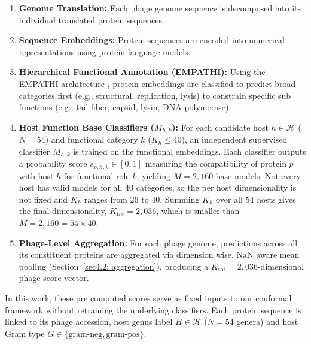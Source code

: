\begin{enumerate}
    \item \textbf{Genome Translation:} Each phage genome sequence is decomposed into its individual translated protein sequences.
    \item \textbf{Sequence Embeddings:} Protein sequences are encoded into numerical representations using protein language models.
    \item \textbf{Hierarchical Functional Annotation (EMPATHI):} Using the EMPATHI architecture \cite{boulay2025empathi}, protein 
          embeddings are classified to predict broad categories first (e.g., structural, replication, lysis) to 
          constrain specific sub functions (e.g., tail fiber, capsid, lysin, DNA polymerase).
    \item \textbf{Host Function Base Classifiers ($M_{h,k}$):} For each candidate host $h \in \mathcal{H}$ ($N = 54$) and functional 
           category $k$ ($K_h \le 40$), an independent supervised classifier $M_{h,k}$ is trained on the functional embeddings. 
           Each classifier outputs a probability score $s_{p,h,k} \in [0, 1]$ measuring the compatibility of protein $p$ with host 
           $h$ for functional role $k$, yielding $M = 2{,}160$ base models. Not every host has valid models for all 40 categories, so 
           the per host dimensionality is not fixed and $K_h$ ranges from 26 to 40. Summing $K_h$ over all 54 hosts gives the final 
           dimensionality, $K_{\text{tot}} = 2{,}036$, which is smaller than $M = 2{,}160 = 54 \times 40$.
    \item \textbf{Phage-Level Aggregation:} For each phage genome, predictions across all its constituent proteins are aggregated via 
           dimension wise, $\mathrm{NaN}$ aware mean pooling (Section~\ref{sec4.2: aggregation}), producing a $K_{\text{tot}} = 
           2{,}036$-dimensional phage score vector.
\end{enumerate}



In this work, these pre computed scores serve as fixed inputs to our conformal framework without retraining the underlying classifiers. 
Each protein sequence is linked to its phage accession, host genus label $H \in \mathcal{H}$ ($N = 54$ genera) and  host Gram type $G \in 
\{\text{gram-neg}, \text{gram-pos}\}$. 

